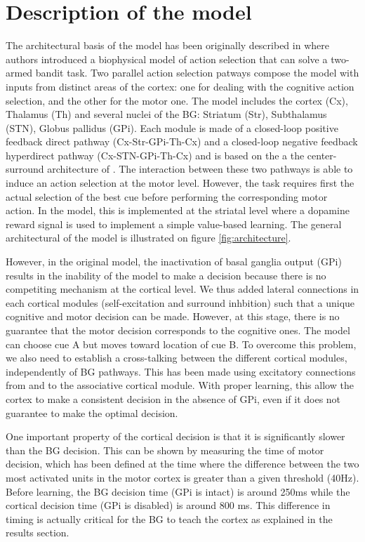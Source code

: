 \section{Description of the model}

The architectural basis of the model has been originally described in
\citet{Guthrie2013} where authors introduced a biophysical model of action
selection that can solve a two-armed bandit task. Two parallel action selection
patways compose the model with inputs from distinct areas of the cortex: one
for dealing with the cognitive action selection, and the other for the motor
one. The model includes the cortex (Cx), Thalamus (Th) and several nuclei of
the BG: Striatum (Str), Subthalamus (STN), Globus pallidus (GPi). Each module
is made of a closed-loop positive feedback direct pathway (Cx-Str-GPi-Th-Cx)
and a closed-loop negative feedback hyperdirect pathway (Cx-STN-GPi-Th-Cx) and
is based on the a the center-surround architecture of \cite{Mink:1996}. The
interaction between these two pathways is able to induce an action selection at
the motor level. However, the task requires first the actual selection of the
best cue before performing the corresponding motor action. In the
\citet{Guthrie2013} model, this is implemented at the striatal level where a
dopamine reward signal is used to implement a simple value-based learning. The
general architectural of the model is illustrated on figure \ref{fig:architecture}.

However, in the original model, the inactivation of basal ganglia output (GPi)
results in the inability of the model to make a decision because there is no
competiting mechanism at the cortical level. We thus added lateral connections
in each cortical modules (self-excitation and surround inhbition) such that a
unique cognitive and motor decision can be made. However, at this stage, there
is no guarantee that the motor decision corresponds to the cognitive ones. The
model can choose cue A but moves toward location of cue B. To overcome this
problem, we also need to establish a cross-talking between the different
cortical modules, independently of BG pathways. This has been made using
excitatory connections from and to the associative cortical module. With proper
learning, this allow the cortex to make a consistent decision in the absence of
GPi, even if it does not guarantee to make the optimal decision.

One important property of the cortical decision is that it is significantly
slower than the BG decision. This can be shown by measuring the time of motor
decision, which has been defined at the time where the difference between the
two most activated units in the motor cortex is greater than a given threshold
(40Hz). Before learning, the BG decision time (GPi is intact) is around 250ms
while the cortical decision time (GPi is disabled) is around 800 ms. This
difference in timing is actually critical for the BG to teach the cortex as
explained in the results section.


